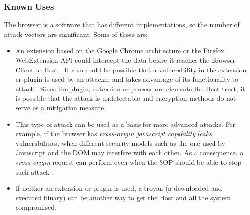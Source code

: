 \documentclass{sig-alternate-05-2015}
\begin{document}
  \subsubsection*{Known Uses} The browser is a software that has different implementations, so the number of attack vectors are significant. Some of these are:
      \begin{itemize}
        \item An extension based on the Google Chrome architecture or the Firefox WebExtension API could intercept the data before it reaches the Browser Client or Host \cite{Paola2006}. It also could be possible that a vulnerability in the extension or plugin is used by an attacker and takes advantage of its functionality to attack \cite{Liu2012,Barth2010}. Since the plugin, extension or process are elements the Host trust, it is possible that the attack is undetectable and encryption methods do not serve as a mitigation measure.
        \item This type of attack can be used as a basis for more advanced attacks. For example, if the browser has \textit{cross-origin javascript capability leaks} vulnerabilities, when different security models such as the one used by Javascript and the DOM may interfere with each other. As a consequence, a \textit{cross-origin} request can perform even when the SOP should be able to stop such attack \cite{Barth2009}.
        \item If neither an extension or plugin is used, a troyan (a downloaded and executed binary) can be another way to get the Host and all the system compromised.
      \end{itemize}
\end{document}
